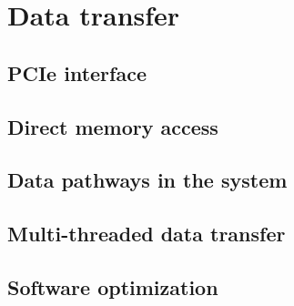 \section{Data transfer} \label{sec:data_transfer}
\subsection{PCIe interface}
\subsection{Direct memory access}
\subsection{Data pathways in the system}
\subsection{Multi-threaded data transfer}
\subsection{Software optimization}

